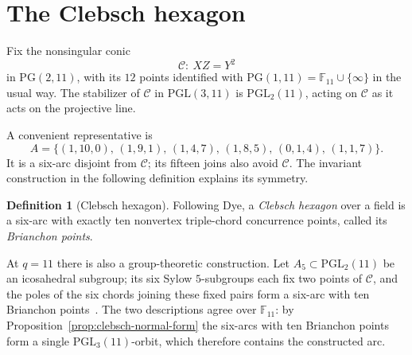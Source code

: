 \documentclass[11pt]{article}
\theoremstyle{definition}
\newtheorem{definition}[theorem]{Definition}
\theoremstyle{remark}
\newcommand{\PG}{\mathrm{PG}}
\newcommand{\F}{\mathbb{F}}
\newcommand{\cC}{\mathcal{C}}
\newcommand{\A}{A_5}
\begin{document}
\section{The Clebsch hexagon}
\label{sec:hexagon}

Fix the nonsingular conic
\[
 \cC:\ XZ=Y^2
\]
in $\PG(2,11)$, with its $12$ points identified with $\PG(1,11)=\F_{11}\cup\{\infty\}$
in the usual way. The stabilizer of $\cC$ in $\mathrm{PGL}(3,11)$ is
$\mathrm{PGL}_2(11)$, acting on $\cC$ as it acts on the projective line.

A convenient representative is
\[
 A=\{(1,10,0),\,(1,9,1),\,(1,4,7),\,(1,8,5),\,(0,1,4),\,(1,1,7)\}.
\]
It is a six-arc disjoint from $\cC$; its fifteen joins also avoid $\cC$.
The invariant construction in the following definition explains its
symmetry.

\begin{definition}[Clebsch hexagon]
\label{def:hexagon}
Following Dye, a \emph{Clebsch hexagon} over a field is a six-arc with
exactly ten nonvertex triple-chord concurrence points, called its
\emph{Brianchon points}.

At $q=11$ there is also a group-theoretic construction.  Let
$\A\subset\mathrm{PGL}_2(11)$ be an icosahedral subgroup; its six Sylow
$5$-subgroups each fix two points of $\cC$, and the poles of the six chords
joining these fixed pairs form a six-arc with ten Brianchon
points~\cite[\S\S29--32]{Edge1956}.  The two descriptions agree over
$\F_{11}$: by Proposition~\ref{prop:clebsch-normal-form} the six-arcs with
ten Brianchon points form a single $\mathrm{PGL}_3(11)$-orbit, which
therefore contains the constructed arc.
\end{definition}
\end{document}
